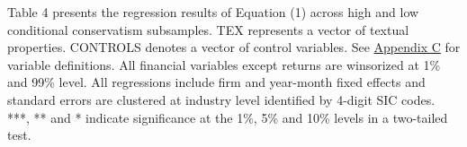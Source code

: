 \begin{table}[H]
\begin{footnotesize}
			\noindent Table 4 presents the regression results of Equation (1) across high and low conditional conservatism subsamples. TEX represents a vector of textual properties. CONTROLS denotes a vector of control variables. See \hyperref[appc]{Appendix C} for variable definitions. All financial variables except returns are winsorized at 1\% and 99\% level. All regressions include firm and year-month fixed effects and standard errors are clustered at industry level identified by 4-digit SIC codes. ***, ** and * indicate significance at the 1\%, 5\% and 10\% levels in a two-tailed test.
		\end{footnotesize}
\end{table}%